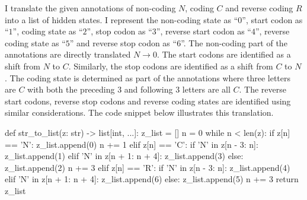 \documentclass[11pt]{article}
\begin{document}
I translate the given annotations of non-coding $N$, coding $C$ and reverse coding $R$ into a list of hidden states.
I represent the non-coding state as ``$0$'', start codon as ``$1$'', coding state as ``$2$'', stop codon as ``$3$'', reverse start codon as ``$4$'', reverse coding state as ``$5$'' and reverse stop codon as ``$6$''.
The non-coding part of the annotations are directly translated $N \to 0$.
The start codons are identified as a shift from $N$ to $C$.
Similarly, the stop codons are identified as a shift from $C$ to $N$.
The coding state is determined as part of the annotations where three letters are $C$ with both the preceding 3 and following 3 letters are all $C$.
The reverse start codons, reverse stop codons and reverse coding states are identified using similar considerations.
The code snippet below illustrates this translation.
\begin{python}
def str_to_list(z: str) -> list[int, ...]:
    z_list = []
    n = 0
    while n < len(z):
        if z[n] == 'N':
            z_list.append(0)
            n += 1
        elif z[n] == 'C':
            if 'N' in z[n - 3: n]:
                z_list.append(1)
            elif 'N' in z[n + 1: n + 4]:
                z_list.append(3)
            else:
                z_list.append(2)
            n += 3
        elif z[n] == 'R':
            if 'N' in z[n - 3: n]:
                z_list.append(4)
            elif 'N' in z[n + 1: n + 4]:
                z_list.append(6)
            else:
                z_list.append(5)
            n += 3
    return z_list
\end{python}
\end{document}
